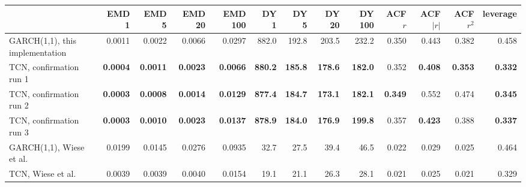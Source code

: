 \begin{tabular}{lrrrrrrrrrrrr}
\toprule
& EMD 1 & EMD 5 & EMD 20 & EMD 100 & DY 1 & DY 5 & DY 20 & DY 100 & ACF $r$ & ACF $|r|$ & ACF $r^2$ & leverage \\
\midrule
GARCH(1,1), this implementation & 0.0011 & 0.0022 & 0.0066 & 0.0297 & 882.0 & 192.8 & 203.5 & 232.2 & 0.350 & 0.443 & 0.382 & 0.458 \\
\addlinespace
TCN, confirmation run 1 & \textbf{0.0004} & \textbf{0.0011} & \textbf{0.0023} & \textbf{0.0066} & \textbf{880.2} & \textbf{185.8} & \textbf{178.6} & \textbf{182.0} & 0.352 & \textbf{0.408} & \textbf{0.353} & \textbf{0.332} \\
TCN, confirmation run 2 & \textbf{0.0003} & \textbf{0.0008} & \textbf{0.0014} & \textbf{0.0129} & \textbf{877.4} & \textbf{184.7} & \textbf{173.1} & \textbf{182.1} & \textbf{0.349} & 0.552 & 0.474 & \textbf{0.345} \\
TCN, confirmation run 3 & \textbf{0.0003} & \textbf{0.0010} & \textbf{0.0023} & \textbf{0.0137} & \textbf{878.9} & \textbf{184.0} & \textbf{176.9} & \textbf{199.8} & 0.357 & \textbf{0.423} & 0.388 & \textbf{0.337} \\
\addlinespace
GARCH(1,1), Wiese et al. & 0.0199 & 0.0145 & 0.0276 & 0.0935 & 32.7 & 27.5 & 39.4 & 46.5 & 0.022 & 0.029 & 0.025 & 0.464 \\
TCN, Wiese et al. & 0.0039 & 0.0039 & 0.0040 & 0.0154 & 19.1 & 21.1 & 26.3 & 28.1 & 0.021 & 0.025 & 0.021 & 0.329 \\
\bottomrule
\end{tabular}
